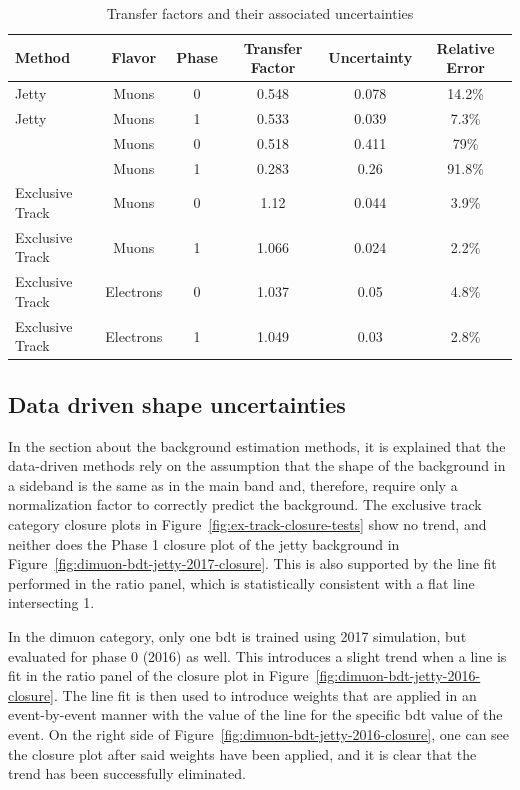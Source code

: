 \begin{table}[hp]
	\centering
	\label{tab:transfer-factors}
		\caption{Transfer factors and their associated uncertainties}
			\begin{tabular}{lccccc} \hline
			Method & Flavor & Phase & Transfer Factor & Uncertainty & Relative Error \\ \hline
			Jetty & Muons & 0 &  0.548 & 0.078 & 14.2\% \\
			Jetty & Muons & 1 &  0.533 & 0.039 & 7.3\% \\
			\tautau & Muons & 0 &  0.518 & 0.411 & 79\% \\
			\tautau & Muons & 1 &  0.283 & 0.26 & 91.8\% \\
			Exclusive Track & Muons & 0 & 1.12 & 0.044 & 3.9\% \\ 
			Exclusive Track & Muons & 1 & 1.066 & 0.024 & 2.2\% \\	
			Exclusive Track & Electrons & 0 & 1.037 & 0.05 & 4.8\% \\	
			Exclusive Track & Electrons & 1 & 1.049 & 0.03 & 2.8\% \\			
			
			\hline
			\end{tabular}
\end{table}

\subsection{Data driven shape uncertainties}
\label{sec:data-driven-shape}

In the section about the background estimation methods, it is explained that the data-driven methods rely on the assumption that the shape of the background in a sideband is the same as in the main band and, therefore, require only a normalization factor to correctly predict the background. The exclusive track category closure plots in Figure~\ref{fig:ex-track-closure-tests} show no trend, and neither does the Phase 1 closure plot of the jetty background in Figure~\ref{fig:dimuon-bdt-jetty-2017-closure}. This is also supported by the line fit performed in the ratio panel, which is statistically consistent with a flat line intersecting 1.

In the dimuon category, only one \gls{bdt} is trained using 2017 simulation, but evaluated for phase 0 (2016) as well. This introduces a slight trend when a line is fit in the ratio panel of the closure plot in Figure~\ref{fig:dimuon-bdt-jetty-2016-closure}. The line fit is then used to introduce weights that are applied in an event-by-event manner with the value of the line for the specific \gls{bdt} value of the event. On the right side of Figure~\ref{fig:dimuon-bdt-jetty-2016-closure}, one can see the closure plot after said weights have been applied, and it is clear that the trend has been successfully eliminated.


